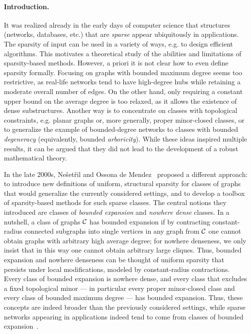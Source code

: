 \paragraph*{Introduction.}
It was realized already in the early days of computer science that structures (networks, databases, etc.) that are {\em{sparse}} appear ubiquitously in applications.
The sparsity of input can be used in a variety of ways, e.g. to design efficient algorithms. This motivates a theoretical study of the abilities and limitations of sparsity-based methods.
However, a priori it is not clear how to even define sparsity formally.
Focusing on graphs with bounded maximum degree seems too restrictive, as real-life networks tend to have high-degree hubs while retaining a moderate overall number of edges.
On the other hand, only requiring a constant upper bound on the average degree is too relaxed, as it allows the existence of dense substructures.
Another way is to concentrate on classes with topological constraints, e.g. planar graphs or, more generally, proper minor-closed classes,
or to generalize the example of bounded-degree networks to classes with bounded {\em{degeneracy}} (equivalently, bounded {\em{arboricity}}).
While these ideas inspired multiple results, it can be argued that they did not lead to the development of a robust mathematical theory.

In the late 2000s, Ne\v{s}et\v{r}il and Ossona de Mendez~\cite{NesetrilM08,NesetrilM08a,NesetrilM08b} proposed a different approach:
to introduce new definitions of uniform, structural sparsity for classes of graphs that would generalize the currently considered settings,
and to develop a toolbox of sparsity-based methods for such sparse classes.
The central notions they introduced are classes of {\em{bounded expansion}} and {\em{nowhere dense}} classes.
In a nutshell, a class of graphs $\mathcal{C}$ has bounded expansion if by contracting constant-radius connected subgraphs into single vertices
in any graph from $\mathcal{C}$ one cannot obtain graphs with arbitrary high average degree; for nowhere denseness, we only insist that in this way one cannot obtain arbitrary large cliques.
Thus, bounded expansion and nowhere denseness can be thought of uniform sparsity that persists under local modifications, modeled by constant-radius contractions.
Every class of bounded expansion is nowhere dense, and every class that excludes a fixed topological minor --- in particular every proper minor-closed class and every class of bounded maximum degree ---
has bounded expansion. Thus, these concepts are indeed broader than the previously considered settings, while sparse networks appearing in applications indeed tend to come from
classes of bounded expansion~\cite{DemaineRRVSS14}.

